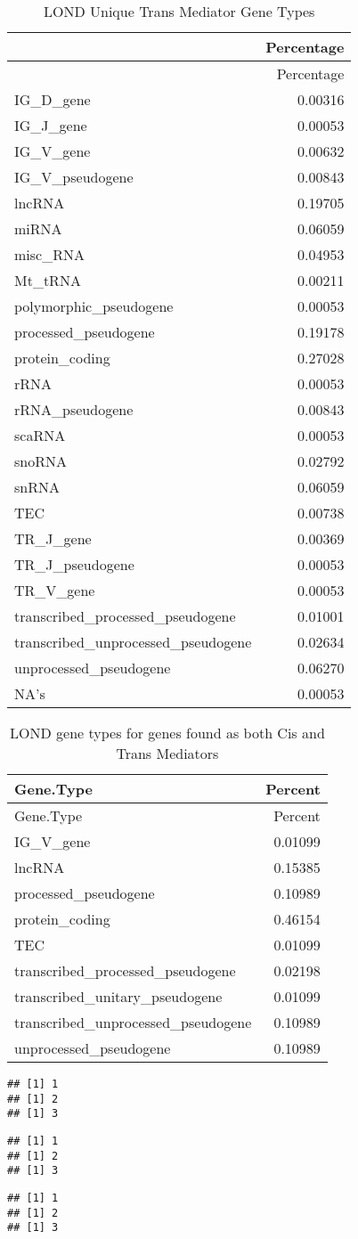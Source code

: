 \documentclass[
  12pt,
]{article}
\begin{document}
\begin{longtable}[]{@{}lr@{}}
\caption{LOND Unique Trans Mediator Gene Types}\tabularnewline
\toprule
& Percentage\tabularnewline
\midrule
\endfirsthead
\toprule
& Percentage\tabularnewline
\midrule
\endhead
IG\_D\_gene & 0.00316\tabularnewline
IG\_J\_gene & 0.00053\tabularnewline
IG\_V\_gene & 0.00632\tabularnewline
IG\_V\_pseudogene & 0.00843\tabularnewline
lncRNA & 0.19705\tabularnewline
miRNA & 0.06059\tabularnewline
misc\_RNA & 0.04953\tabularnewline
Mt\_tRNA & 0.00211\tabularnewline
polymorphic\_pseudogene & 0.00053\tabularnewline
processed\_pseudogene & 0.19178\tabularnewline
protein\_coding & 0.27028\tabularnewline
rRNA & 0.00053\tabularnewline
rRNA\_pseudogene & 0.00843\tabularnewline
scaRNA & 0.00053\tabularnewline
snoRNA & 0.02792\tabularnewline
snRNA & 0.06059\tabularnewline
TEC & 0.00738\tabularnewline
TR\_J\_gene & 0.00369\tabularnewline
TR\_J\_pseudogene & 0.00053\tabularnewline
TR\_V\_gene & 0.00053\tabularnewline
transcribed\_processed\_pseudogene & 0.01001\tabularnewline
transcribed\_unprocessed\_pseudogene & 0.02634\tabularnewline
unprocessed\_pseudogene & 0.06270\tabularnewline
NA's & 0.00053\tabularnewline
\bottomrule
\end{longtable}

\begin{longtable}[]{@{}lr@{}}
\caption{LOND gene types for genes found as both Cis and Trans
Mediators}\tabularnewline
\toprule
Gene.Type & Percent\tabularnewline
\midrule
\endfirsthead
\toprule
Gene.Type & Percent\tabularnewline
\midrule
\endhead
IG\_V\_gene & 0.01099\tabularnewline
lncRNA & 0.15385\tabularnewline
processed\_pseudogene & 0.10989\tabularnewline
protein\_coding & 0.46154\tabularnewline
TEC & 0.01099\tabularnewline
transcribed\_processed\_pseudogene & 0.02198\tabularnewline
transcribed\_unitary\_pseudogene & 0.01099\tabularnewline
transcribed\_unprocessed\_pseudogene & 0.10989\tabularnewline
unprocessed\_pseudogene & 0.10989\tabularnewline
\bottomrule
\end{longtable}

\begin{verbatim}
## [1] 1
## [1] 2
## [1] 3
\end{verbatim}

\begin{verbatim}
## [1] 1
## [1] 2
## [1] 3
\end{verbatim}

\begin{verbatim}
## [1] 1
## [1] 2
## [1] 3
\end{verbatim}
\end{document}
